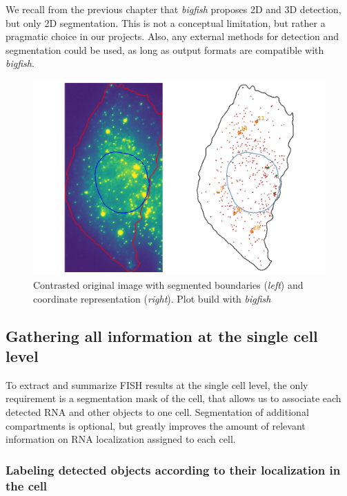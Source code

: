 We recall from the previous chapter that \emph{bigfish} proposes 2D and 3D detection, but only 2D segmentation.
This is not a conceptual limitation, but rather a pragmatic choice in our projects.
Also, any external methods for detection and segmentation could be used, as long as output formats are compatible with \emph{bigfish}.

\begin{figure}[]
    \centering
    \includegraphics[width=\textwidth]{figures/chapter4/cell_extracted_0}
    \caption[Coordinate representation of a cell]{Contrasted original image with segmented boundaries (\textit{left}) and coordinate representation (\textit{right}).
	Plot build with \emph{bigfish}}
    \label{fig:cell_extracted_0}
\end{figure}

\subsection{Gathering all information at the single cell level}
\label{subsec:coordinate_representation}

To extract and summarize \ac{FISH} results at the single cell level, the only requirement is a segmentation mask of the cell, that allows us to associate each detected \ac{RNA} and other objects to one cell.
Segmentation of additional compartments is optional, but greatly improves the amount of relevant information on \ac{RNA} localization assigned to each cell.

\subsubsection{Labeling detected objects according to their localization in the cell}


